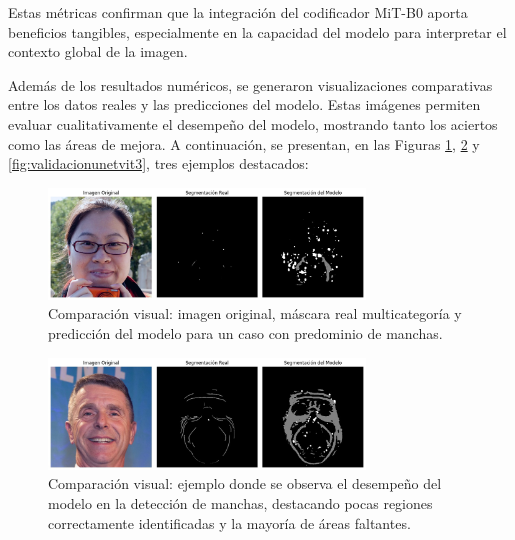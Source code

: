 \begin{enumerate}
\begin{itemize}
\begin{itemize}
\end{itemize}
Estas métricas confirman que la integración del codificador MiT-B0 aporta beneficios tangibles, especialmente en la capacidad del modelo para interpretar el contexto global de la imagen.



  Además de los resultados numéricos, se generaron visualizaciones comparativas entre los datos reales y las predicciones del modelo. Estas imágenes permiten evaluar cualitativamente el desempeño del modelo, mostrando tanto los aciertos como las áreas de mejora. A continuación, se presentan, en las Figuras \ref{fig:validacionunetvit1}, \ref{fig:validacionunetvit2} y \ref{fig:validacionunetvit3}, tres ejemplos destacados:

  \vspace{0.5cm}
  
  \begin{figure}[H]
  \centering
  \includegraphics[width=0.75\textwidth]{4/figures/unetvit1.jpg}
  \caption{Comparación visual: imagen original, máscara real multicategoría y predicción del modelo para un caso con predominio de manchas.}
  \label{fig:validacionunetvit1}
  \end{figure}
  
  \begin{figure}[H]
  \centering
  \includegraphics[width=0.75\textwidth]{4/figures/unetvit2.jpg}
  \caption{Comparación visual: ejemplo donde se observa el desempeño del modelo en la detección de manchas, destacando pocas regiones correctamente identificadas y la mayoría de áreas faltantes.}
  \label{fig:validacionunetvit2}
  \end{figure}
  

\end{itemize}
\end{enumerate}

